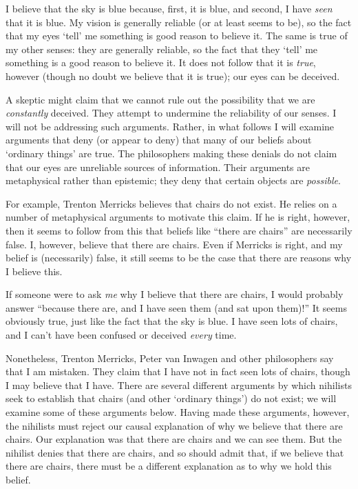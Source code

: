 \documentclass[11pt]{article}
\begin{document}
\begin{spacing}{1.5}
I believe that the sky is blue because, first, it is blue, and second,
I have {\em seen} that it is blue.  My vision is generally reliable
(or at least seems to be), so the fact that my eyes `tell' me
something is good reason to believe it.  The same is true of my other
senses: they are generally reliable, so the fact that they `tell' me
something is a good reason to believe it.  It does not follow that it
is {\em true}, however (though no doubt we believe that it is true);
our eyes can be deceived.

A skeptic might claim that we cannot rule out the possibility that we
are {\em constantly} deceived.  They attempt to undermine the
reliability of our senses.  I will not be addressing such arguments.
Rather, in what follows I will examine arguments that deny (or appear
to deny) that many of our beliefs about `ordinary things' are true.
The philosophers making these denials do not claim that our eyes are
unreliable sources of information.  Their arguments are metaphysical
rather than epistemic; they deny that certain objects are {\em
  possible}.  

For example, Trenton Merricks believes that chairs do not exist.  He
relies on a number of metaphysical arguments to motivate this claim.
If he is right, however, then it seems to follow from this that
beliefs like ``there are chairs'' are necessarily false.  I, however,
believe that there are chairs.  Even if Merricks is right, and my
belief is (necessarily) false, it still seems to be the case that
there are reasons why I believe this.

If someone were to ask {\em me} why I believe that there are chairs, I
would probably answer ``because there are, and I have seen them (and
sat upon them)!''  It seems obviously true, just like the fact that
the sky is blue.  I have seen lots of chairs, and I can't have been
confused or deceived {\em every} time.

Nonetheless, Trenton Merricks, Peter van Inwagen and other
philosophers say that I am mistaken.  They claim that I have not in
fact seen lots of chairs, though I may believe that I have.  There are
several different arguments by which nihilists seek to establish that
chairs (and other `ordinary things') do not exist; we will examine
some of these arguments below.  Having made these arguments, however,
the nihilists must reject our causal explanation of why we believe
that there are chairs.  Our explanation was that there are chairs and
we can see them.  But the nihilist denies that there are chairs, and
so should admit that, if we believe that there are chairs, there must
be a different explanation as to why we hold this belief.


\end{spacing}
\end{document}
